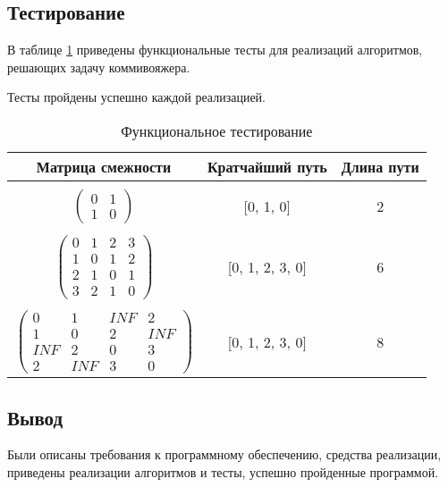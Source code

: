 \vspace{\baselineskip}
\subsection{Тестирование}
\vspace{\baselineskip}

В таблице \ref{tabular:func_test} приведены функциональные тесты для реализаций алгоритмов, решающих задачу коммивояжера.

Тесты пройдены успешно каждой реализацией.

\clearpage

\begin{table}[h!]
	\begin{center}
	    \begin{threeparttable}
	    \captionsetup{justification=raggedright, singlelinecheck=off}
	    \caption{\label{tabular:func_test} Функциональное тестирование}
		\begin{tabular}{|c|c|c|}
			\hline
			Матрица смежности & Кратчайший путь & Длина пути \tabularnewline 
			\hline
			
			 &  & \tabularnewline[-1em]
			$\begin{pmatrix}
				0 & 1\\
				1 & 0
			\end{pmatrix}$ &
			  [0, 1, 0] &
			2
			\tabularnewline[2em]
			\hline
			
			 &  & \\[-1em]
			$\begin{pmatrix}
				0 & 1 & 2 & 3 \\
				1 & 0 & 1 & 2 \\
				2 & 1 & 0 & 1 \\
                3 & 2 & 1 & 0
			\end{pmatrix}$ &
			  [0, 1, 2, 3, 0] &
			6
			\tabularnewline[4em]
			\hline
			
			 &  & \\[-1em]
			$\begin{pmatrix}
				0 & 1 & INF & 2 \\
				1 & 0 & 2 & INF \\
				INF & 2 & 0 & 3 \\
                2 & INF & 3 & 0
			\end{pmatrix}$ &
			[0, 1, 2, 3, 0] &
			8
			\tabularnewline[4em]
			\hline
		\end{tabular}
		\end{threeparttable}
	\end{center}
\end{table}

\subsection*{Вывод}

Были описаны требования к программному обеспечению, средства реализации, приведены реализации алгоритмов и тесты, успешно пройденные программой.
